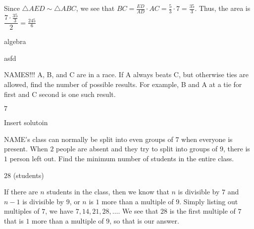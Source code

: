\documentclass[11pt]{article}
\begin{document}
\begin{solution}
Since $\triangle AED \sim \triangle ABC$, we see that $BC = \frac{ED}{AD} \cdot AC = \frac{5}{3} \cdot 7 = \frac{35}{3}$. Thus, the area is $\dfrac{7 \cdot \frac{35}{3}}{2} = \boxed{\frac{245}{6}}$
\end{solution}


\begin{problem}
algebra
\end{problem}

\begin{answer}

\end{answer}

\begin{solution}
asfd
\end{solution}


\begin{problem}
NAMES!!! A, B, and C are in a race. If A always beats C, but otherwise ties are allowed, find the number of possible results. For example, B and A at a tie for first and C second is one such result.
\end{problem}

\begin{answer}
$\boxed{7}$
\end{answer}

\begin{solution}
Insert solutoin
\end{solution}


\begin{problem}
NAME's class can normally be split into even groups of $7$ when everyone is present. When $2$ people are absent and they try to split into groups of $9$, there is $1$ person left out. Find the minimum number of students in the entire class.
\end{problem}

\begin{answer}
$\boxed{28}$ (students)
\end{answer}

\begin{solution}
If there are $n$ students in the class, then we know that $n$ is divisible by $7$ and $n-1$ is divisible by $9$, or $n$ is $1$ more than a multiple of $9$. Simply listing out multiples of $7$, we have $7, 14, 21, 28, \ldots$. We see that $\boxed{28}$ is the first multiple of $7$ that is $1$ more than a multiple of $9$, so that is our answer.
\end{solution}
\end{document}
